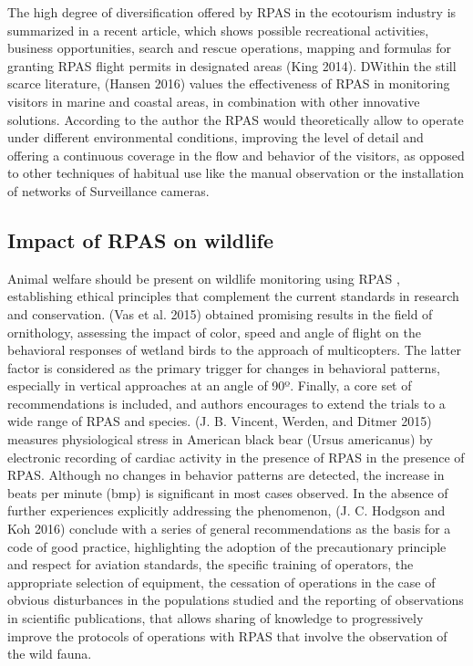 \documentclass[]{interact}
\theoremstyle{plain}%
\theoremstyle{definition}
\theoremstyle{remark}
\begin{document}
The high degree of diversification offered by RPAS in the ecotourism
industry is summarized in a recent article, which shows possible
recreational activities, business opportunities, search and rescue
operations, mapping and formulas for granting RPAS flight permits in
designated areas (King 2014). DWithin the still scarce literature,
(Hansen 2016) values the effectiveness of RPAS in monitoring visitors in
marine and coastal areas, in combination with other innovative
solutions. According to the author the RPAS would theoretically allow to
operate under different environmental conditions, improving the level of
detail and offering a continuous coverage in the flow and behavior of
the visitors, as opposed to other techniques of habitual use like the
manual observation or the installation of networks of Surveillance
cameras.

\subsection{Impact of RPAS on
wildlife}\label{impact-of-rpas-on-wildlife}

Animal welfare should be present on wildlife monitoring using RPAS ,
establishing ethical principles that complement the current standards in
research and conservation. (Vas et al. 2015) obtained promising results
in the field of ornithology, assessing the impact of color, speed and
angle of flight on the behavioral responses of wetland birds to the
approach of multicopters. The latter factor is considered as the primary
trigger for changes in behavioral patterns, especially in vertical
approaches at an angle of 90º. Finally, a core set of recommendations is
included, and authors encourages to extend the trials to a wide range of
RPAS and species. (J. B. Vincent, Werden, and Ditmer 2015) measures
physiological stress in American black bear (Ursus americanus) by
electronic recording of cardiac activity in the presence of RPAS in the
presence of RPAS. Although no changes in behavior patterns are detected,
the increase in beats per minute (bmp) is significant in most cases
observed. In the absence of further experiences explicitly addressing
the phenomenon, (J. C. Hodgson and Koh 2016) conclude with a series of
general recommendations as the basis for a code of good practice,
highlighting the adoption of the precautionary principle and respect for
aviation standards, the specific training of operators, the appropriate
selection of equipment, the cessation of operations in the case of
obvious disturbances in the populations studied and the reporting of
observations in scientific publications, that allows sharing of
knowledge to progressively improve the protocols of operations with RPAS
that involve the observation of the wild fauna.
\end{document}
